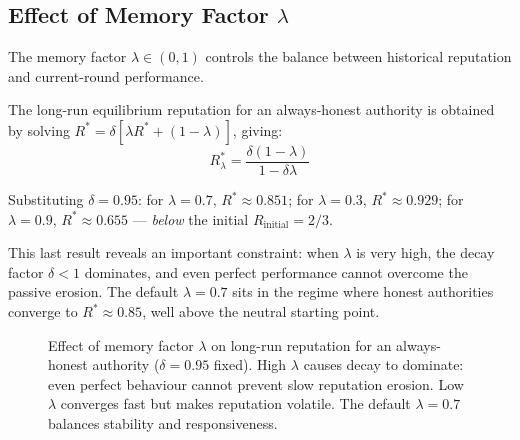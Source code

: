 \documentclass[12pt,a4paper]{article}
\theoremstyle{definition}
\theoremstyle{remark}
\begin{document}
\subsection{Effect of Memory Factor \texorpdfstring{$\lambda$}{lambda}}

The memory factor $\lambda \in (0,1)$ controls the balance between
historical reputation and current-round performance.

The long-run equilibrium reputation for an always-honest authority is
obtained by solving $R^* = \delta[\lambda R^* + (1-\lambda)]$, giving:
\begin{equation}
  R^*_{\lambda} = \frac{\delta(1-\lambda)}{1 - \delta\lambda}
  \label{eq:equil}
\end{equation}

Substituting $\delta = 0.95$: for $\lambda = 0.7$, $R^* \approx 0.851$;
for $\lambda = 0.3$, $R^* \approx 0.929$;
for $\lambda = 0.9$, $R^* \approx 0.655$ — \emph{below} the initial
$R_{\text{initial}} = 2/3$.

This last result reveals an important constraint: when $\lambda$ is very
high, the decay factor $\delta < 1$ dominates, and even perfect performance
cannot overcome the passive erosion.
The default $\lambda = 0.7$ sits in the regime where honest authorities
converge to $R^* \approx 0.85$, well above the neutral starting point.

\begin{figure}[H]
\centering
{}
\caption{Effect of memory factor $\lambda$ on long-run reputation for an
  always-honest authority ($\delta=0.95$ fixed).
  High $\lambda$ causes decay to dominate: even perfect behaviour cannot
  prevent slow reputation erosion. Low $\lambda$ converges fast but makes
  reputation volatile. The default $\lambda=0.7$ balances stability and
  responsiveness.}
\label{fig:lambda_sensitivity}
\end{figure}
\end{document}
